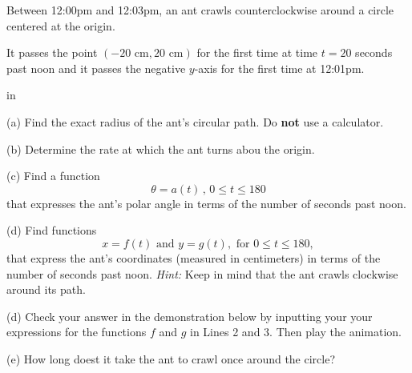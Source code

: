 \documentclass{ximera}
\newcommand{\pskip}{\vskip 0.1 in}
\begin{document}
\begin{question}  \label{Q3dbgdfds5:Motion1}
Between 12:00pm and 12:03pm, an ant crawls counterclockwise around a circle centered at the origin. 

It passes the point $(-20 \text{ cm},20 \text{ cm})$ for the first time at time $t=20$ seconds past noon and it passes the negative $y$-axis for the first time at 12:01pm.

\pskip

(a) Find the exact radius of the ant's circular path. Do {\bf not} use a calculator.

(b) Determine the rate at which the ant turns abou the origin.

(c) Find a function 
\[
   \theta = a(t) \, , \, 0\leq t \leq 180
\]
that expresses the ant's polar angle in terms of the number of seconds past noon.

(d) Find functions
\[
   x = f(t) \text{ and } y=g(t) , \text{ for } 0\leq t \leq 180 ,
\]
that express the ant's coordinates (measured in centimeters) in terms of the number of seconds past noon. {\it Hint:} Keep in mind that the ant crawls clockwise around its path.

(d) Check your answer in the demonstration below by inputting your your expressions for the functions $f$ and $g$ in Lines 2 and 3. Then play the animation.

(e) How long doest it take the ant to crawl once around the circle?

 
\begin{onlineOnly}
    \begin{center}
\end{center}
\end{onlineOnly}


\end{question}
\end{document}
